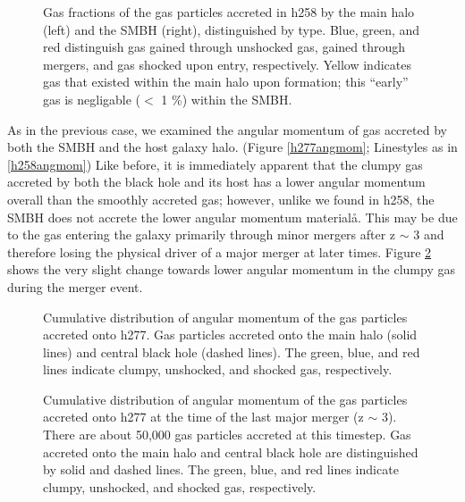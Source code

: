 \documentclass[12pt,headA,chapB]{fiskthesis}
\begin{document}
\begin{figure}[h]
\centerline{}
\caption[GASOLINE h258 Galaxy and SMBH Gas Fractions at z=0]{Gas fractions of the gas particles accreted in h258 by the main halo (left) and the SMBH (right), distinguished by type. Blue, green, and red distinguish gas gained through unshocked gas, gained through mergers, and gas shocked upon entry, respectively. Yellow indicates gas that existed within the main halo upon formation; this ``early'' gas is negligable ($<$ 1 \%) within the SMBH.}
\label{h277stackfrac} 
\end{figure}

As in the previous case, we examined the angular momentum of gas accreted by both the SMBH and the host galaxy halo. (Figure \ref{h277angmom}; Linestyles as in \ref{h258angmom}) Like before, it is immediately apparent that the clumpy gas accreted by both the black hole and its host has a lower angular momentum overall than the smoothly accreted gas; however, unlike we found in h258, the SMBH does not accrete the lower angular momentum materialå. This may be due to the gas entering the galaxy primarily through minor mergers after z $\sim$ 3 and therefore losing the physical driver of a major merger at later times. Figure \ref{h277angmom_merger} shows the very slight change towards lower angular momentum in the clumpy gas during the merger event. 



\begin{figure}
\centerline{}
\caption[GASOLINE h258 Cumulative Angular Momentum Distribution]{ Cumulative distribution of angular momentum of the gas particles accreted onto h277.  Gas particles accreted onto the main halo (solid lines) and central black hole (dashed lines). The green, blue, and red lines indicate clumpy, unshocked, and shocked gas, respectively.}
\label{h277angmom} 

\centerline{}
\caption[GASOLINE h258 Merger Angular Momentum Distribution]{ Cumulative distribution of angular momentum of the gas particles accreted onto h277 at the time of the last major merger (z $\sim$ 3). There are about 50,000 gas particles accreted at this timestep. Gas accreted onto the main halo and central black hole are distinguished by solid and dashed lines. The green, blue, and red lines indicate clumpy, unshocked, and shocked gas, respectively.}
\label{h277angmom_merger} 
\end{figure}
\end{document}
